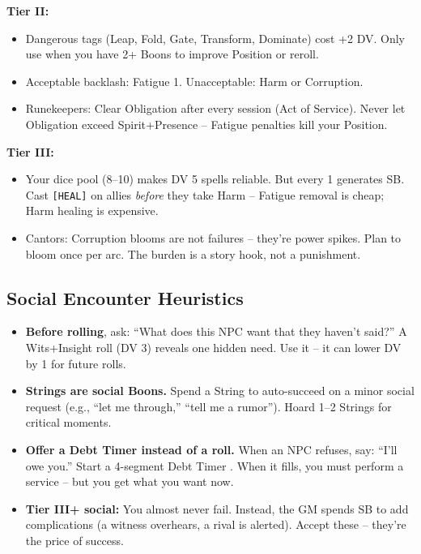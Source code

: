 \documentclass[11pt]{article}
\begin{document}
\textbf{Tier II:}
\begin{itemize}
    \item Dangerous tags (Leap, Fold, Gate, Transform, Dominate) cost +2 DV. Only use when you have 2+ Boons to improve Position or reroll.
    \item Acceptable backlash: Fatigue 1. Unacceptable: Harm or Corruption.
    \item Runekeepers: Clear Obligation after every session (Act of Service). Never let Obligation exceed Spirit+Presence – Fatigue penalties kill your Position.
\end{itemize}

\textbf{Tier III:}
\begin{itemize}
    \item Your dice pool (8–10) makes DV 5 spells reliable. But every 1 generates SB. Cast \texttt{[HEAL]} on allies \textit{before} they take Harm – Fatigue removal is cheap; Harm healing is expensive.
    \item Cantors: Corruption blooms are not failures – they're power spikes. Plan to bloom once per arc. The burden is a story hook, not a punishment.
\end{itemize}

\subsection*{Social Encounter Heuristics}

\begin{itemize}
    \item \textbf{Before rolling}, ask: ``What does this NPC want that they haven't said?'' A Wits+Insight roll (DV 3) reveals one hidden need. Use it – it can lower DV by 1 for future rolls.
    \item \textbf{Strings are social Boons.} Spend a String to auto-succeed on a minor social request (e.g., ``let me through,'' ``tell me a rumor''). Hoard 1–2 Strings for critical moments.
    \item \textbf{Offer a Debt Timer instead of a roll.} When an NPC refuses, say: ``I'll owe you.'' Start a 4-segment Debt Timer . When it fills, you must perform a service – but you get what you want now.
    \item \textbf{Tier III+ social:} You almost never fail. Instead, the GM spends SB to add complications (a witness overhears, a rival is alerted). Accept these – they're the price of success.
\end{itemize}
\end{document}
